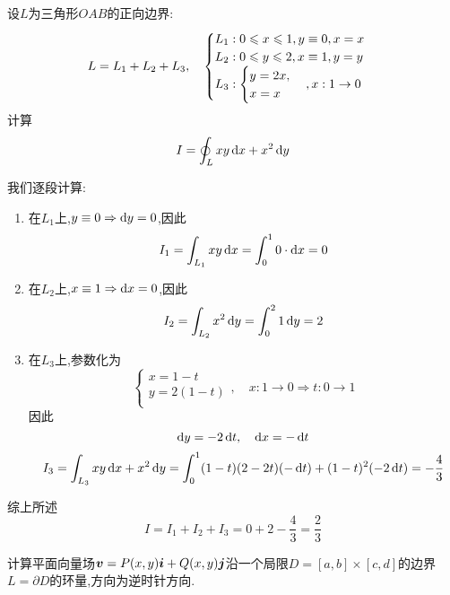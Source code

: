 \begin{example}
    设$L$为三角形$OAB$的正向边界:$$L = L_1 + L_2 + L_3,\quad \begin{cases}
        L_1: 0 \leqslant x \leqslant 1, y \equiv 0, x = x\\
        L_2: 0 \leqslant y \leqslant 2, x \equiv 1, y = y\\
        L_3: \begin{cases}
            y = 2x,\\
            x=x\\
        \end{cases},x : 1 \to 0
    \end{cases}$$
    计算$$I  = \oint_L xy \operatorname{d\!} x + x^2 \operatorname{d\!} y$$
\end{example}

\begin{solution}
    我们逐段计算:
    \begin{enumerate}
        \item 在$L_1$上,$y \equiv 0 \Rightarrow \operatorname{d\!} y = 0$,因此$$I_1 = \int_{L_1} xy \operatorname{d\!} x = \int_0^1 0 \cdot \operatorname{d\!} x = 0$$
        \item 在$L_2$上,$x \equiv 1 \Rightarrow \operatorname{d\!} x = 0$,因此$$I_2 = \int_{L_2} x^2 \operatorname{d\!} y = \int_0^2 1 \operatorname{d\!} y = 2$$
        \item 在$L_3$上,参数化为$$\begin{cases}
            x = 1-t\\
            y = 2(1-t)\\
        \end{cases}, \quad x:1 \to 0 \Rightarrow t:0 \to 1$$
        因此$$\operatorname{d\!} y = -2 \operatorname{d\!} t ,\quad \operatorname{d\!} x = -\operatorname{d\!} t$$
        $$I_3 = \int_{L_3} xy \operatorname{d\!} x + x^2 \operatorname{d\!} y = \int_0^1 (1-t)(2-2t) (-\operatorname{d\!} t) + (1-t)^2 (-2 \operatorname{d\!} t) = -\frac{4}{3}$$
    \end{enumerate}
    综上所述$$I = I_1 + I_2 + I_3 = 0 + 2 - \frac{4}{3} = \frac{2}{3}$$
\end{solution}

\begin{example}
    计算平面向量场$\bm{v} = P(x,y) \bm{i} + Q(x,y) \bm{j}$沿一个局限$D = [a,b] \times [c,d]$的边界$L = \partial D$的环量,方向为逆时针方向.
\end{example}

